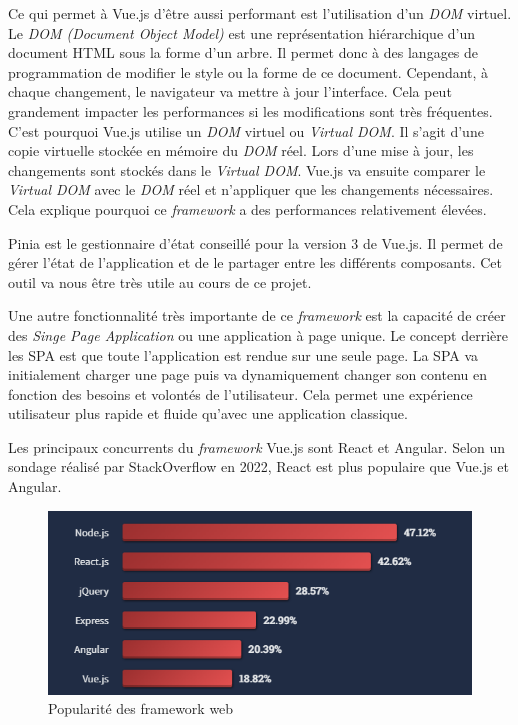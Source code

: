 Ce qui permet à Vue.js d'être aussi performant est l'utilisation d'un \emph{DOM} virtuel. Le \emph{DOM (Document Object Model)} est une représentation hiérarchique d'un document HTML sous la forme d'un arbre. Il permet donc à des langages de programmation de modifier le style ou la forme de ce document. Cependant, à chaque changement, le navigateur va mettre à jour l'interface. Cela peut grandement impacter les performances si les modifications sont très fréquentes. C'est pourquoi Vue.js utilise un \emph{DOM} virtuel ou \emph{Virtual DOM}. Il s'agit d'une copie virtuelle stockée en mémoire du \emph{DOM} réel. Lors d'une mise à jour, les changements sont stockés dans le \emph{Virtual DOM}. Vue.js va ensuite comparer le \emph{Virtual DOM} avec le \emph{DOM} réel et n'appliquer que les changements nécessaires. Cela explique pourquoi ce \emph{framework} a des performances relativement élevées.

Pinia est le gestionnaire d'état conseillé pour la version 3 de Vue.js. Il permet de gérer l'état de l'application et de le partager entre les différents composants. Cet outil va nous être très utile au cours de ce projet.

Une autre fonctionnalité très importante de ce \emph{framework} est la capacité de créer des \emph{Singe Page Application} ou une application à page unique. Le concept derrière les SPA est que toute l'application est rendue sur une seule page. La SPA va initialement charger une page puis va dynamiquement changer son contenu en fonction des besoins et volontés de l'utilisateur. Cela permet une expérience utilisateur plus rapide et fluide qu'avec une application classique.

Les principaux concurrents du \emph{framework} Vue.js sont React et Angular. Selon un sondage réalisé par StackOverflow \cite{StackoverflowSurvey} en 2022, React est plus populaire que Vue.js et Angular.
\begin{center}
    \begin{figure}[H]%
        \includegraphics[width=\textwidth]{./assets/figures/VueVSReactVSAngular.png}
        \caption{Popularité des framework web \label{VueVSReactVSAngular.png}}
    \end{figure}
\end{center}

